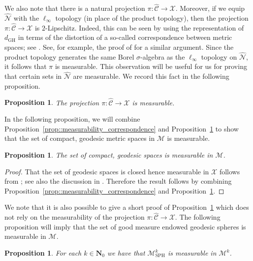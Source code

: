 \documentclass[10pt]{amsart}
\let\mathcal\mathscr
\theoremstyle{plain}
\numberwithin{theorem}{section}
\newtheorem{proposition}[theorem]{Proposition}
\theoremstyle{definition}
\newcommand\gmsspace{{\mathcal M}_{\mathrm{SPH}}}
\newcommand\mmspace{{\mathcal M}}
\newcommand{\matrixmspace}{\mathcal N}
\newcommand{\compactmatrix}{\mathcal C}
\newcommand{\N}{\mathbf{N}}
\newcommand{\gh}{{\mathcal X}}
\newcommand{\dgh}{d_{\mathrm {GH}}}
\let\wh\widehat
\begin{document}
We also note that there is a natural projection $\pi \colon \wh{\compactmatrix} \to \gh$. Moreover, if we equip~$\wh{\matrixmspace}$ with the $\ell_\infty$ topology (in place of the product topology), then the projection $\pi \colon \wh{\compactmatrix} \to \gh$ is $2$-Lipschitz. Indeed, this can be seen by using the representation of $\dgh$ in terms of the distortion of a so-called correspondence between metric spaces; see \cite[Chap.\,27]{villanibook}. See, for example, the proof of \cite[Prop.\,3.3.3]{miermontstflour} for a similar argument. Since the product topology generates the same Borel $\sigma$-algebra as the $\ell_\infty$ topology on $\wh{\matrixmspace}$, it follows that $\pi$ is measurable. This observation will be useful for us for proving that certain sets in $\wh{\matrixmspace}$ are measurable. We record this fact in the following proposition.

\begin{proposition}
\label{prop::gm_measurable}
The projection $\pi \colon \wh{\compactmatrix} \to \gh$ is measurable.
\end{proposition}

In the following proposition, we will combine Proposition~\ref{prop::measurability_correspondence} and Proposition~\ref{prop::gm_measurable} to show that the set of compact, geodesic metric spaces in $\mmspace$ is measurable.

\begin{proposition}
\label{prop::geodesic_closed}
The set of compact, geodesic spaces is measurable in $\mmspace$.
\end{proposition}
\begin{proof}
That the set of geodesic spaces is closed hence measurable in $\gh$ follows from \cite[Th.\,27.9]{villanibook}; see also the discussion in \cite[Chap.\,7.5]{courseinmetricgeometry}. Therefore the result follows by combining Proposition~\ref{prop::measurability_correspondence} and Proposition~\ref{prop::gm_measurable}.
\end{proof}

We note that it is also possible to give a short proof of Proposition~\ref{prop::geodesic_closed} which does not rely on the measurability of the projection $\pi \colon \wh{\compactmatrix} \to \gh$. The following proposition will imply that the set of good measure endowed geodesic spheres is measurable in $\mmspace$.

\begin{proposition}
\label{prop::geodesic_spheres_measurable}
For each $k \in \N_0$ we have that $\gmsspace^k$ is measurable in $\mmspace^k$.
\end{proposition}
\end{document}
